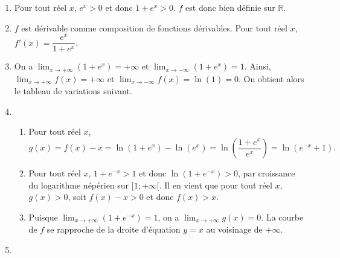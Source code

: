 \documentclass[11pt,fleqn, openany]{book} %
\begin{document}
\begin{solution}\hspace{0pt}

\begin{enumerate}\item Pour tout réel \(x\), \(e^x >0\) et donc \(1+e^x>0\). \(f\) est donc bien définie sur \(\mathbb{R}\).
	\item \(f\) est dérivable comme composition de fonctions dérivables. Pour tout réel \(x\), \(f'(x)=\dfrac{e^x}{1+e^x}\).
	\item On a \(\displaystyle\lim_{x \to + \infty}(1+e^x)=+\infty\) et \(\displaystyle\lim_{x \to - \infty}(1+e^x)=1\). Ainsi, \(\displaystyle\lim_{x \to + \infty}f(x)=+\infty\) et \(\displaystyle\lim_{x \to - \infty}f(x)=\ln(1)=0\). On obtient alors le tableau de variations suivant.


\begin{center}\end{center}

\item \begin{enumerate}\item Pour tout réel \(x\), \[g(x)=f(x)-x=\ln(1+e^x)-\ln(e^x)=\ln\left(\dfrac{1+e^x}{e^x}\right)=\ln(e^{-x}+1).\]
	\item Pour tout réel \(x\), \(1+e^{-x}>1\) et donc \(\ln(1+e^{-x})>0\), par croissance du logarithme népérien sur \([1;+\infty[\). Il en vient que pour tout réel \(x\), \(g(x)>0\), soit \(f(x)-x>0\) et donc \(f(x)>x\).
	\item Puisque \(\displaystyle\lim_{x\to +\infty}(1+e^{-x})=1\), on a \(\displaystyle\lim_{x\to +\infty}g(x)=0\). La courbe de \(f\) se rapproche de la droite d'équation \(y=x\) au voisinage de \(+\infty\).\end{enumerate}
	\item 

\begin{center}\end{center}
\end{enumerate}


\end{solution}
\end{document}
